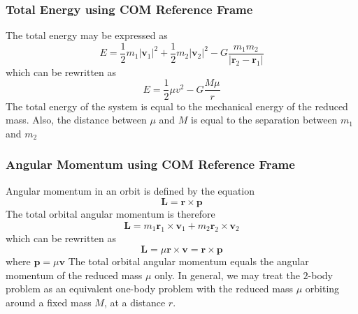 \documentclass{article}
\begin{document}
\subsubsection{Total Energy using COM Reference Frame}
The total energy may be expressed as 
$$E=\frac{1}{2}m_1|\textbf{v}_1|^2+\frac{1}{2}m_2|\textbf{v}_2|^2-G\frac{m_1m_2}{|\textbf{r}_2-\textbf{r}_1|}$$
which can be rewritten as
$$E=\frac{1}{2}\mu v^2-G\frac{M\mu}{r}$$
The total energy of the system is equal to the mechanical energy of the reduced mass. Also, the distance between $\mu$ and $M$ is equal to the separation between $m_1$ and $m_2$
\subsubsection{Angular Momentum using COM Reference Frame}
Angular momentum in an orbit is defined by the equation 
$$\textbf{L}=\textbf{r}\times\textbf{p}$$
The total orbital angular momentum is therefore
$$\textbf{L}=m_1\textbf{r}_1\times\textbf{v}_1+m_2\textbf{r}_2\times\textbf{v}_2$$
which can be rewritten as 
$$\textbf{L}=\mu \textbf{r}\times\textbf{v}=\textbf{r}\times\textbf{p}$$
where $\textbf{p}=\mu \textbf{v}$
The total orbital angular momentum equals the angular momentum of the reduced mass $\mu$ only. In general, we may treat the $2$-body problem as an equivalent one-body problem with the reduced mass $\mu$ orbiting around a fixed mass $M$, at a distance $r$.
\end{document}
